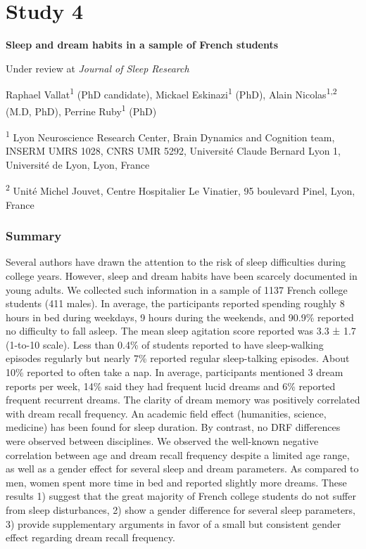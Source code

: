 \cleardoublepage

\chapter{Study 4}
\label{res:survey}

\textbf{{\large Sleep and dream habits in a sample of French students}}

\hfill Under review at \emph{Journal of Sleep Research}

\bigskip

Raphael Vallat\textsuperscript{1} (PhD candidate), Mickael Eskinazi\textsuperscript{1} (PhD), Alain Nicolas\textsuperscript{1,2} (M.D, PhD), Perrine Ruby\textsuperscript{1} (PhD)

\textsuperscript{1} Lyon Neuroscience Research Center, Brain Dynamics and Cognition team, INSERM UMRS 1028, CNRS UMR 5292, Université Claude Bernard Lyon 1, Université de Lyon, Lyon, France

\textsuperscript{2} Unité Michel Jouvet, Centre Hospitalier Le Vinatier, 95 boulevard Pinel, Lyon, France

\subsection*{Summary}
\label{res:survey:summary}

Several authors have drawn the attention to the risk of sleep difficulties during college years. However, sleep and dream habits have been scarcely documented in young adults. We collected such information in a sample of 1137 French college students (411 males). In average, the participants reported spending roughly 8 hours in bed during weekdays, 9 hours during the weekends, and 90.9\% reported no difficulty to fall asleep. The mean sleep agitation score reported was 3.3 ± 1.7 (1-to-10 scale). Less than 0.4\% of students reported to have sleep-walking episodes regularly but nearly 7\% reported regular sleep-talking episodes. About 10\% reported to often take a nap. In average, participants mentioned 3 dream reports per week, 14\% said they had frequent lucid dreams and 6\% reported frequent recurrent dreams. The clarity of dream memory was positively correlated with dream recall frequency. An academic field effect (humanities, science, medicine) has been found for sleep duration. By contrast, no DRF differences were observed between disciplines. We observed the well-known negative correlation between age and dream recall frequency despite a limited age range, as well as a gender effect for several sleep and dream parameters. As compared to men, women spent more time in bed and reported slightly more dreams. These results 1) suggest that the great majority of French college students do not suffer from sleep disturbances, 2) show a gender difference for several sleep parameters, 3) provide supplementary arguments in favor of a small but consistent gender effect regarding dream recall frequency.

